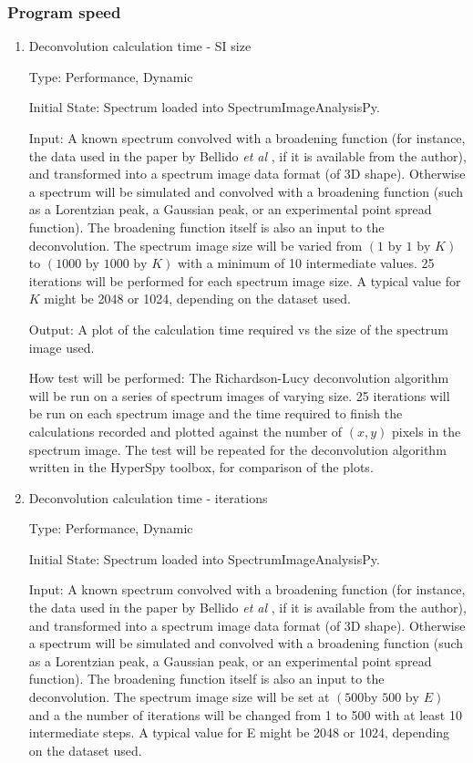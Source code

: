 \documentclass[12pt, titlepage]{article}
\newcommand{\progname}{SpectrumImageAnalysisPy}
\begin{document}
\subsubsection{Program speed}

\begin{enumerate}

\paragraph{Deconvolution}
\item{Deconvolution calculation time - SI size}

Type: Performance, Dynamic
					
Initial State: Spectrum loaded into \progname{}.

Input: A known spectrum convolved with a broadening function (for instance, the
data used in the paper by Bellido \textit{et al} \cite{bellido_toward_2014}, if
it is available from the author), and transformed into a spectrum image data
format (of 3D shape). Otherwise a spectrum will be simulated and convolved with
a broadening function (such as a Lorentzian peak, a Gaussian peak, or an
experimental point spread function). The broadening function itself is also an
input to the deconvolution. The spectrum image size will be varied from
$(1\text{ by }1\text{ by }K)$ to $(1000 \text{ by } 1000 \text{ by } K)$ with a
minimum of 10 intermediate values. 25 iterations will be performed for each
spectrum image size. A typical value for $K$ might be 2048 or 1024, depending on
the dataset used.

Output: A plot of the calculation time required vs the size of the spectrum
image used.

How test will be performed: The Richardson-Lucy deconvolution algorithm will be
run on a series of spectrum images of varying size. 25 iterations will be run on
each spectrum image and the time required to finish the calculations recorded
and plotted against the number of $(x, y)$ pixels in the spectrum image. The
test will be repeated for the deconvolution algorithm written in the HyperSpy
toolbox, for comparison of the plots.\\


\item{Deconvolution calculation time - iterations}

Type: Performance, Dynamic
					
Initial State: Spectrum loaded into \progname{}.

Input: A known spectrum convolved with a broadening function (for instance, the
data used in the paper by Bellido \textit{et al} \cite{bellido_toward_2014}, if
it is available from the author), and transformed into a spectrum image data
format (of 3D shape). Otherwise a spectrum will be simulated and convolved with
a broadening function (such as a Lorentzian peak, a Gaussian peak, or an
experimental point spread function). The broadening function itself is also an
input to the deconvolution. The spectrum image size will be set at $(500 \text{
by } 500 \text{ by } E)$ and a the number of iterations will be changed from 1
to 500 with at least 10 intermediate steps. A typical value for E might be 2048
or 1024, depending on the dataset used.


\end{enumerate}
\end{document}
